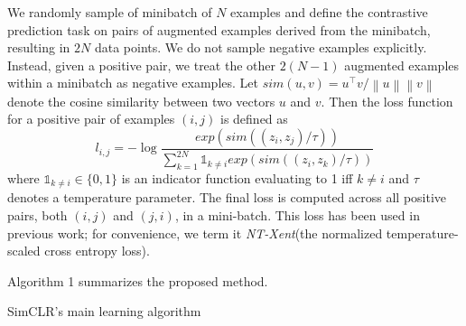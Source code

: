 \documentclass[conference]{IEEEtran}
\begin{document}
We randomly sample of minibatch of $N$ examples and define the contrastive prediction task on pairs of augmented examples derived from the minibatch, resulting in $2N$ data points.
We do not sample negative examples explicitly. 
Instead, given a positive pair, we treat the other $2(N-1)$ augmented examples within a minibatch as negative examples.
Let $sim(u,v) = u^{\top}v/\left\lVert u \right\rVert  \left\lVert  v \right\rVert  $ denote the cosine similarity between two vectors $u$ and $v$.
Then the loss function for a positive pair of examples $(i,j)$ is defined as
\begin{equation}
    l_{i,j} = -\log{\frac{exp(sim((z_i, z_j)/\tau))}{\sum_{k=1}^{2N}\mathbb{1}_{k \neq i}exp(sim((z_i, z_k)/\tau)) }}
\end{equation}
where $\mathbb{1}_{k \neq i} \in \{0,1\}$ is an indicator function evaluating to 1 iff $k \neq i$ and $\tau$ denotes a temperature parameter.
The final loss is computed across all positive pairs, both $(i,j)$ and $(j,i)$, in a mini-batch.
This loss has been used in previous work; for convenience, we term it \textit{NT-Xent}(the normalized temperature-scaled cross entropy loss).

Algorithm 1 summarizes the proposed method.

\begin{algorithm}
    \SetAlgoLined
     \caption{SimCLR's main learning algorithm}
\end{algorithm}
\end{document}
